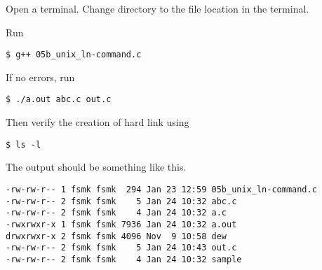 Open a terminal. Change directory to the file location in the terminal.

Run
\begin{lstlisting}[style=shell-command]
$ g++ 05b_unix_ln-command.c
\end{lstlisting}

If no errors, run
\begin{lstlisting}[style=shell-command]
$ ./a.out abc.c out.c
\end{lstlisting}

Then verify the creation of hard link using
\begin{lstlisting}[style=shell-command]
$ ls -l
\end{lstlisting}


The output should be something like this.
\begin{lstlisting}[style=shell-output]
-rw-rw-r-- 1 fsmk fsmk  294 Jan 23 12:59 05b_unix_ln-command.c
-rw-rw-r-- 2 fsmk fsmk    5 Jan 24 10:32 abc.c
-rw-rw-r-- 2 fsmk fsmk    4 Jan 24 10:32 a.c
-rwxrwxr-x 1 fsmk fsmk 7936 Jan 24 10:32 a.out
drwxrwxr-x 2 fsmk fsmk 4096 Nov  9 10:58 dew
-rw-rw-r-- 2 fsmk fsmk    5 Jan 24 10:43 out.c
-rw-rw-r-- 2 fsmk fsmk    4 Jan 24 10:32 sample
\end{lstlisting}
